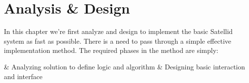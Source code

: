 \chapter{Analysis \& Design}
\label{chap:analysis-design}

In this chapter we're first analyze and design to implement the basic Satellid system as fast as possible.
There is a need to pass through a simple effective implementation method.
The required phases in the method are simply:

\begin{easylist}
& Analyzing solution to define logic and algorithm
& Designing basic interaction and interface
\end{easylist}
